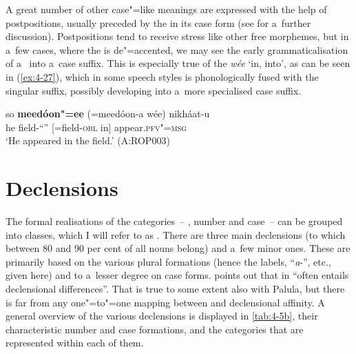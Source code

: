 A great number of other case"=like meanings are expressed with the help of postpositions, usually
preceded by the  in its  case form (see  for a~further discussion). Postpositions
tend to receive stress like other free morphemes, but in a~few cases, where the  is
de"=accented, we may see the early grammaticalisation of a~ into a~case suffix. This is
especially true of the  \textit{wée} `in, into', as can be seen in (\ref{ex:4-27}),
which in some speech styles is phonologically fused with the singular  suffix, possibly
developing into a~more specialised  case suffix.

\begin{exe}
\ex
\label{ex:4-27}
 \gll so \textbf{meedóon"=ee} (=meedóon-a wée) nikháat-u \\
	he field\textsc{-``''} [=field-\textsc{obl} in] appear.\textsc{pfv"=msg} \\
\glt `He appeared in the field.' (A:ROP003)
\end{exe}

\section{Declensions}
\label{sec:4-6}

  The formal realisations of the categories~-- , number and case~-- can be grouped into
   classes, which I will refer to as . There are three main declensions (to which between 80 and 90 per cent of all nouns belong)
  and a~few minor ones. These are primarily
  based on the various plural formations (hence the
   labels, ``\textit{a}-'', etc., given here) and to a~lesser degree on 
  case forms. \citet[219]{masica1991} points out that  in \iliNIA ``often entails declensional
  differences''. That is true to some extent also with Palula, but there is far from any one"=to"=one
  mapping between  and declensional affinity. A general overview of the various declensions is displayed in \ref{tab:4-5b}, their characteristic number and case formations, and the  categories that are represented within each of them.  


